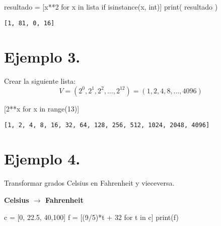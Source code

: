 \documentclass[
  letterpaper,
  DIV=11,
  numbers=noendperiod]{scrreprt}
\newenvironment{Shaded}{\begin{snugshade}}{\end{snugshade}}
\newcommand{\BuiltInTok}[1]{\textcolor[rgb]{0.00,0.23,0.31}{#1}}
\newcommand{\ControlFlowTok}[1]{\textcolor[rgb]{0.00,0.23,0.31}{#1}}
\newcommand{\DecValTok}[1]{\textcolor[rgb]{0.68,0.00,0.00}{#1}}
\newcommand{\FloatTok}[1]{\textcolor[rgb]{0.68,0.00,0.00}{#1}}
\newcommand{\KeywordTok}[1]{\textcolor[rgb]{0.00,0.23,0.31}{#1}}
\newcommand{\NormalTok}[1]{\textcolor[rgb]{0.00,0.23,0.31}{#1}}
\newcommand{\OperatorTok}[1]{\textcolor[rgb]{0.37,0.37,0.37}{#1}}
\begin{document}
\begin{Shaded}
\begin{Highlighting}[]
\NormalTok{resultado }\OperatorTok{=}\NormalTok{ [x}\OperatorTok{**}\DecValTok{2} \ControlFlowTok{for}\NormalTok{ x }\KeywordTok{in}\NormalTok{ lista }\ControlFlowTok{if} \BuiltInTok{isinstance}\NormalTok{(x, }\BuiltInTok{int}\NormalTok{)]}
\BuiltInTok{print}\NormalTok{( resultado )}
\end{Highlighting}
\end{Shaded}

\begin{verbatim}
[1, 81, 0, 16]
\end{verbatim}

\section{\texorpdfstring{\textbf{Ejemplo
3.}}{Ejemplo 3.}}\label{ejemplo-3.-2}

Crear la siguiente lista:
\[V = (2^0,2^1,2^2, \dots, 2^{12}) = (1, 2, 4, 8, \dots, 4096) \]

\begin{Shaded}
\begin{Highlighting}[]
\NormalTok{[}\DecValTok{2}\OperatorTok{**}\NormalTok{x }\ControlFlowTok{for}\NormalTok{ x }\KeywordTok{in} \BuiltInTok{range}\NormalTok{(}\DecValTok{13}\NormalTok{)]}
\end{Highlighting}
\end{Shaded}

\begin{verbatim}
[1, 2, 4, 8, 16, 32, 64, 128, 256, 512, 1024, 2048, 4096]
\end{verbatim}

\section{\texorpdfstring{\textbf{Ejemplo
4.}}{Ejemplo 4.}}\label{ejemplo-4.-2}

Transformar grados Celsius en Fahrenheit y vieceversa.

\textbf{Celsius \(\to\) Fahrenheit}

\begin{Shaded}
\begin{Highlighting}[]
\NormalTok{c }\OperatorTok{=}\NormalTok{ [}\DecValTok{0}\NormalTok{, }\FloatTok{22.5}\NormalTok{, }\DecValTok{40}\NormalTok{,}\DecValTok{100}\NormalTok{]}
\NormalTok{f }\OperatorTok{=}\NormalTok{ [(}\DecValTok{9}\OperatorTok{/}\DecValTok{5}\NormalTok{)}\OperatorTok{*}\NormalTok{t }\OperatorTok{+} \DecValTok{32} \ControlFlowTok{for}\NormalTok{ t }\KeywordTok{in}\NormalTok{ c]}
\BuiltInTok{print}\NormalTok{(f)}
\end{Highlighting}
\end{Shaded}
\end{document}
